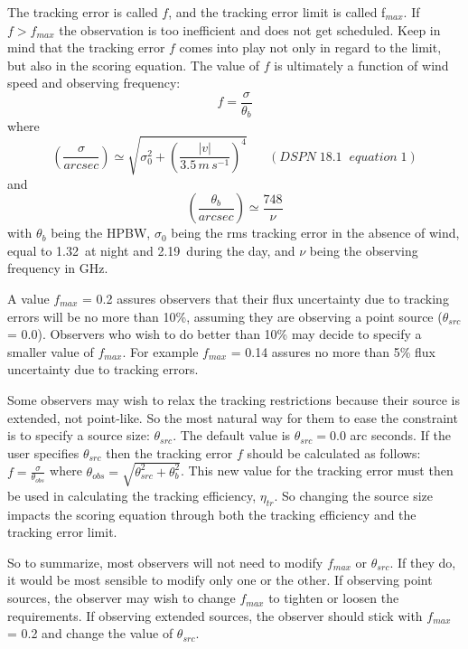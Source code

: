 \begin{itemize}
The tracking error is called $f$, and the tracking error limit is called f$_{max}$. If 
$f > f_{max}$ the observation is too inefficient and does not get scheduled. 
Keep in mind that the tracking error $f$ comes into play not only in regard to the 
limit, but also in the scoring equation.  The value of $f$ is ultimately a function of wind 
speed and observing frequency: $$f = \frac{\sigma}{\theta_b}$$
where
$$\left(\frac{\sigma}{arcsec}\right) \simeq \sqrt{\sigma_0^2+\left(\frac{|v|}{3.5\,m\,s^{-1}}\right)^4}
\;\;\;\;\;\;(DSPN\;18.1\;\;equation\;1)$$ 
and $$\left(\frac{\theta_b}{arcsec}\right) \simeq \frac{748}{\nu}$$
with $\theta_b$ being the HPBW, $\sigma_0$ being the rms tracking error in the absence of wind, equal to 
1.32\arcsecond\ at night and 2.19\arcsecond\ during the day, and $\nu$ being the observing frequency
in GHz.

A value $f_{max}$ = 0.2 assures observers that their flux uncertainty due to 
tracking errors will be no more than 10\%, assuming they are observing a point 
source ($\theta_{src}$ = 0.0).  Observers who wish to do better than 10\% may decide 
to specify a smaller value of $f_{max}$.  For example $f_{max}$ = 0.14 assures no more 
than 5\% flux uncertainty due to tracking errors.

Some observers may wish to relax the tracking restrictions because their source 
is extended, not point-like.  So the most natural way for them to ease the 
constraint is to specify a source size: $\theta_{src}$.  The default value is $\theta_{src} = 0.0$
arc seconds.  If the user specifies 
$\theta_{src}$ then the tracking error $f$ should be calculated as follows: $f = \frac{\sigma}{\theta_{obs}}$
where $\theta_{obs} = \sqrt{\theta_{src}^2 + \theta_b^2}$.  This new value for the tracking error
must then be used in calculating the tracking efficiency, $\eta_{tr}$.
So changing the source size impacts the scoring equation through both the tracking efficiency
and the tracking error limit.

So to summarize, most observers will not need to modify $f_{max}$ or $\theta_{src}$. 
If they do, it would be most sensible to modify only one or the other.  If 
observing point sources, the observer may wish to change $f_{max}$ to tighten or 
loosen the requirements.  If observing extended sources, the observer should 
stick with $f_{max}$ = 0.2 and change the value of $\theta_{src}$.


\end{itemize}
